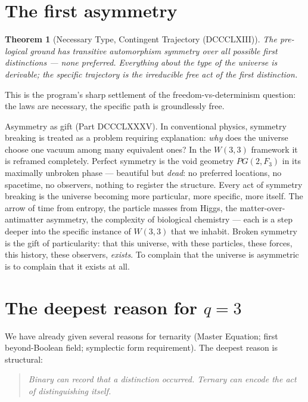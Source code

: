 \documentclass[11pt]{article}
\def\mathbb#1{#1}%
\def\mathrm#1{#1}%
\def\textbf#1{#1}%
\newtheorem*{theorem}{Theorem}
\begin{document}
\section{The first asymmetry}

\begin{theorem}[Necessary Type, Contingent Trajectory (DCCCLXIII)]
The pre-logical ground has transitive automorphism symmetry over all possible first distinctions --- none preferred. Everything about the \emph{type} of the universe is derivable; the specific \emph{trajectory} is the irreducible free act of the first distinction.
\end{theorem}

This is the program's sharp settlement of the freedom-vs-determinism question: the laws are necessary, the specific path is groundlessly free.

\textbf{Asymmetry as gift (Part DCCCLXXXV).} In conventional physics, symmetry breaking is treated as a problem requiring explanation: \emph{why} does the universe choose one vacuum among many equivalent ones? In the $W(3,3)$ framework it is reframed completely. Perfect symmetry is the void geometry $\mathrm{PG}(2, \mathbb{F}_3)$ in its maximally unbroken phase --- beautiful but \emph{dead}: no preferred locations, no spacetime, no observers, nothing to register the structure. Every act of symmetry breaking is the universe becoming more particular, more specific, more itself. The arrow of time from entropy, the particle masses from Higgs, the matter-over-antimatter asymmetry, the complexity of biological chemistry --- each is a step deeper into the specific instance of $W(3,3)$ that we inhabit. \textbf{Broken symmetry is the gift of particularity}: that this universe, with these particles, these forces, this history, these observers, \emph{exists}. To complain that the universe is asymmetric is to complain that it exists at all.

\section{\texorpdfstring{The deepest reason for $q = 3$}{The deepest reason for q = 3}}

We have already given several reasons for ternarity (Master Equation; first beyond-Boolean field; symplectic form requirement). The deepest reason is structural:

\begin{quote}
\itshape
Binary can record \emph{that} a distinction occurred. Ternary can encode \emph{the act of distinguishing itself}.
\end{quote}
\end{document}
